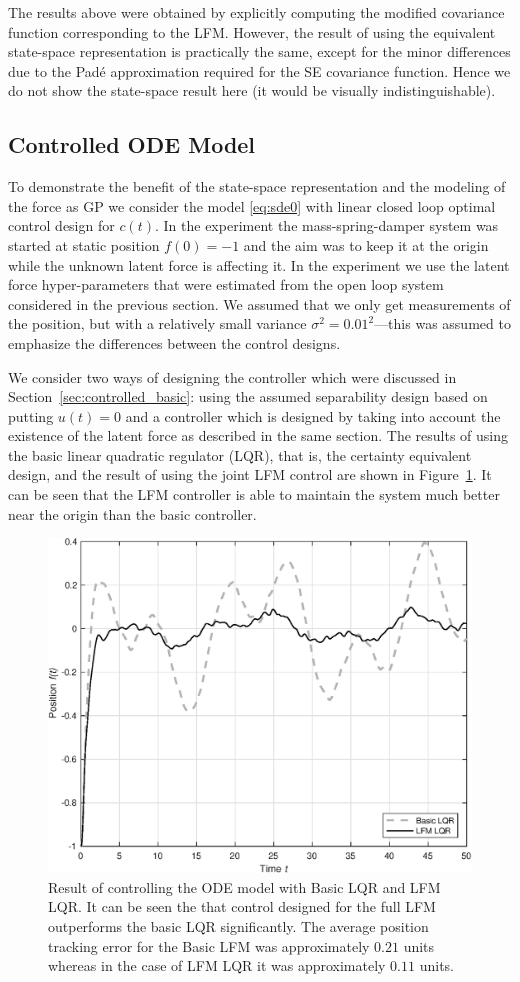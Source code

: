 \documentclass[journal]{IEEEtran}
\begin{document}
The results above were obtained by explicitly computing the modified covariance function corresponding to the LFM. However, the result of using the equivalent state-space representation is practically the same, except for the minor differences due to the Pad\'e approximation required for the SE covariance function. Hence we do not show the state-space result here (it would be visually indistinguishable).

\subsection{Controlled ODE Model}

To demonstrate the benefit of the state-space representation and the modeling of the force as GP we consider the model \eqref{eq:sde0} with linear closed loop optimal control design for $c(t)$. In the experiment the mass-spring-damper system was started at static position $f(0) = -1$ and the aim was to keep it at the origin while the unknown latent force is affecting it. In the experiment we use the latent force hyper-parameters that were estimated from the open loop system considered in the previous section. We assumed that we only get measurements of the position, but with a relatively small variance $\sigma^2 = 0.01^2$---this was assumed to emphasize the differences between the control designs.

We consider two ways of designing the controller which were discussed in Section~\ref{sec:controlled_basic}: using the
assumed separability design based on putting $u(t) = 0$ and a controller which is designed by taking into account the existence of the latent force as described in the same section. The results of using the basic linear quadratic regulator (LQR), that is, the certainty equivalent design, and the result of using the joint LFM control are shown in Figure~\ref{fig:cntl_spring}. It can be seen that the LFM controller is able to maintain the system much better near the origin than the basic controller.

\begin{figure}[!t]
\centering
\includegraphics[width=0.7\columnwidth]{cntl_spring}
\caption{Result of controlling the ODE model with Basic LQR and LFM LQR. It can be seen the that control designed for the full LFM outperforms the basic LQR significantly. The average position tracking error for the Basic LFM was approximately $0.21$ units whereas in the case of LFM LQR it was approximately $0.11$ units.}
\label{fig:cntl_spring}
\end{figure}
\end{document}
